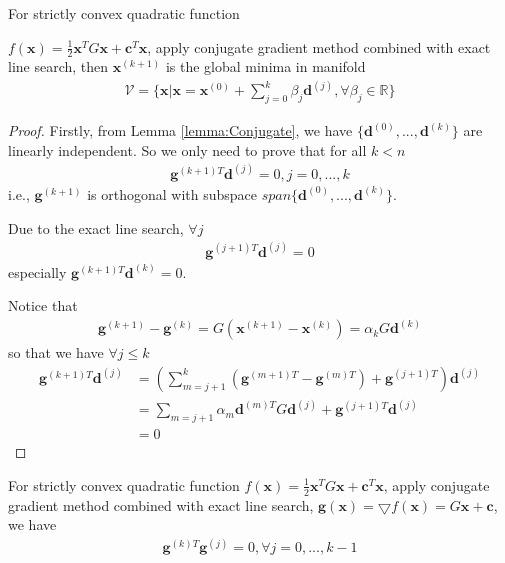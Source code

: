 \begin{theorem}
    For strictly convex quadratic function 
    \par\noindent
    $f(\mathbf{x}) = \frac{1}{2} \mathbf{x}^T G \mathbf{x} + \mathbf{c}^T\mathbf{x}$,
    apply conjugate gradient method combined with exact line search,
    then $\mathbf{x}^{(k+1)}$ is the global minima in manifold
    \begin{align}
        \mathcal{V} =  \{ \mathbf{x} | \mathbf{x} = \mathbf{x}^{(0)} + 
        \sum_{j=0}^k\beta_j\mathbf{d}^{(j)}, \forall \beta_j \in \mathbb{R} \}
    \end{align}
    \label{th:Conjugate}
\end{theorem}
\begin{proof}
    Firstly, from Lemma \ref{lemma:Conjugate}, we have 
    $\{ \mathbf{d}^{(0)}, ...,\mathbf{d}^{(k)}\}$ are linearly independent.
    So we only need to prove that 
    for all $k < n$
    \begin{align}
        \mathbf{g}^{(k+1)T}\mathbf{d}^{(j)} = 0, j = 0,..., k
    \end{align}
    i.e., $\mathbf{g}^{(k+1)}$ is orthogonal with subspace
    $span\{\mathbf{d}^{(0)}, ...,\mathbf{d}^{(k)}\}$.
    \par
    Due to the exact line search, $\forall j$
    \begin{align}
        \mathbf{g}^{(j+1)T}\mathbf{d}^{(j)} = 0
    \end{align}
    especially $\mathbf{g}^{(k+1)T}\mathbf{d}^{(k)} = 0$.
    \par
    Notice that 
    \begin{align}
        \mathbf{g}^{(k+1)} - \mathbf{g}^{(k)}
        = G (\mathbf{x}^{(k+1)} - \mathbf{x}^{(k)})
        = \alpha_k G \mathbf{d}^{(k)}
    \end{align}
    so that we have $\forall j \leq k$
    \begin{align}
        \mathbf{g}^{(k+1)T}\mathbf{d}^{(j)}
        &= (\sum_{m=j+1}^k (\mathbf{g}^{(m+1)T} - \mathbf{g}^{(m)T})
        + \mathbf{g}^{(j+1)T} )\mathbf{d}^{(j)} \\
        &= \sum_{m=j+1} \alpha_m \mathbf{d}^{(m)T}G \mathbf{d}^{(j)}
        + \mathbf{g}^{(j+1)T} \mathbf{d}^{(j)} \\
        &= 0
    \end{align}
    
\end{proof}
\begin{lemma}
    For strictly convex quadratic function 
    $f(\mathbf{x}) = \frac{1}{2} \mathbf{x}^T G \mathbf{x} + \mathbf{c}^T\mathbf{x}$,
    apply conjugate gradient method combined with exact line search,
    $\mathbf{g}(\mathbf{x}) = \bigtriangledown f(\mathbf{x}) = G\mathbf{x} + \mathbf{c}$,
    we have
    \begin{align}
        \mathbf{g}^{(k)T}\mathbf{g}^{(j)} = 0, \forall j = 0,..., k-1
    \end{align}
    \label{lemma:Conjugate}
\end{lemma}

